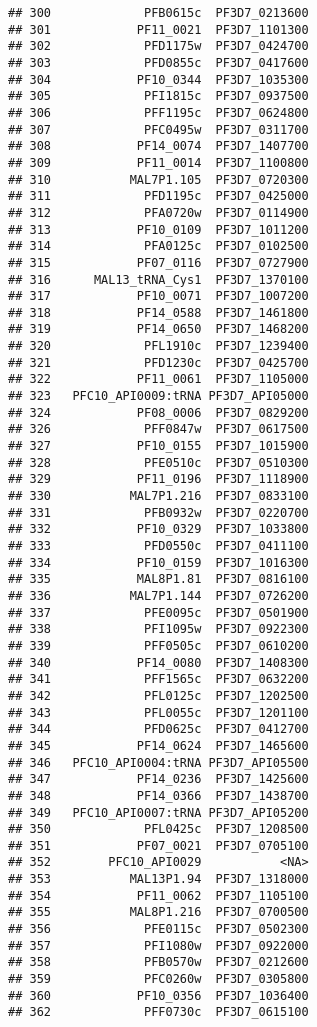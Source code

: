 \documentclass{article}\usepackage[]{graphicx}\usepackage[]{color}
\makeatletter
\newenvironment{kframe}{%
 \def\at@end@of@kframe{}%
 \ifinner\ifhmode%
  \def\at@end@of@kframe{\end{minipage}}%
  \begin{minipage}{\columnwidth}%
 \fi\fi%
 \def\FrameCommand##1{\hskip\@totalleftmargin \hskip-\fboxsep
 \colorbox{shadecolor}{##1}\hskip-\fboxsep
     \hskip-\linewidth \hskip-\@totalleftmargin \hskip\columnwidth}%
 \MakeFramed {\advance\hsize-\width
   \@totalleftmargin\z@ \linewidth\hsize
   \@setminipage}}%
 {\par\unskip\endMakeFramed%
 \at@end@of@kframe}
\newenvironment{knitrout}{}{} %
\makeatother
\begin{document}
\begin{knitrout}
\begin{kframe}
\begin{verbatim}
## 300             PFB0615c  PF3D7_0213600
## 301            PF11_0021  PF3D7_1101300
## 302             PFD1175w  PF3D7_0424700
## 303             PFD0855c  PF3D7_0417600
## 304            PF10_0344  PF3D7_1035300
## 305             PFI1815c  PF3D7_0937500
## 306             PFF1195c  PF3D7_0624800
## 307             PFC0495w  PF3D7_0311700
## 308            PF14_0074  PF3D7_1407700
## 309            PF11_0014  PF3D7_1100800
## 310           MAL7P1.105  PF3D7_0720300
## 311             PFD1195c  PF3D7_0425000
## 312             PFA0720w  PF3D7_0114900
## 313            PF10_0109  PF3D7_1011200
## 314             PFA0125c  PF3D7_0102500
## 315            PF07_0116  PF3D7_0727900
## 316      MAL13_tRNA_Cys1  PF3D7_1370100
## 317            PF10_0071  PF3D7_1007200
## 318            PF14_0588  PF3D7_1461800
## 319            PF14_0650  PF3D7_1468200
## 320             PFL1910c  PF3D7_1239400
## 321             PFD1230c  PF3D7_0425700
## 322            PF11_0061  PF3D7_1105000
## 323   PFC10_API0009:tRNA PF3D7_API05000
## 324            PF08_0006  PF3D7_0829200
## 326             PFF0847w  PF3D7_0617500
## 327            PF10_0155  PF3D7_1015900
## 328             PFE0510c  PF3D7_0510300
## 329            PF11_0196  PF3D7_1118900
## 330           MAL7P1.216  PF3D7_0833100
## 331             PFB0932w  PF3D7_0220700
## 332            PF10_0329  PF3D7_1033800
## 333             PFD0550c  PF3D7_0411100
## 334            PF10_0159  PF3D7_1016300
## 335            MAL8P1.81  PF3D7_0816100
## 336           MAL7P1.144  PF3D7_0726200
## 337             PFE0095c  PF3D7_0501900
## 338             PFI1095w  PF3D7_0922300
## 339             PFF0505c  PF3D7_0610200
## 340            PF14_0080  PF3D7_1408300
## 341             PFF1565c  PF3D7_0632200
## 342             PFL0125c  PF3D7_1202500
## 343             PFL0055c  PF3D7_1201100
## 344             PFD0625c  PF3D7_0412700
## 345            PF14_0624  PF3D7_1465600
## 346   PFC10_API0004:tRNA PF3D7_API05500
## 347            PF14_0236  PF3D7_1425600
## 348            PF14_0366  PF3D7_1438700
## 349   PFC10_API0007:tRNA PF3D7_API05200
## 350             PFL0425c  PF3D7_1208500
## 351            PF07_0021  PF3D7_0705100
## 352        PFC10_API0029           <NA>
## 353           MAL13P1.94  PF3D7_1318000
## 354            PF11_0062  PF3D7_1105100
## 355           MAL8P1.216  PF3D7_0700500
## 356             PFE0115c  PF3D7_0502300
## 357             PFI1080w  PF3D7_0922000
## 358             PFB0570w  PF3D7_0212600
## 359             PFC0260w  PF3D7_0305800
## 360            PF10_0356  PF3D7_1036400
## 362             PFF0730c  PF3D7_0615100

\end{verbatim}
\end{kframe}
\end{knitrout}
\end{document}
